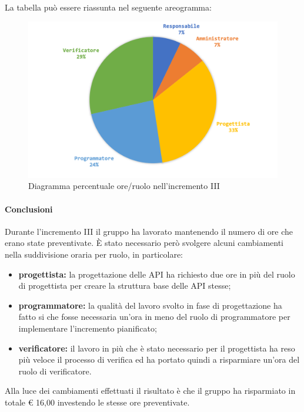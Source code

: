 			La tabella può essere riassunta nel seguente areogramma:
			\begin{figure}[H]
				\centering
				\includegraphics[width=0.8\linewidth]{images/consuntivo/ConsIncr3-2.png}
				\caption{Diagramma percentuale ore/ruolo nell'incremento III}
				\label{fig:consuntivo diagramma costi ruolo incremento III}
			\end{figure}

		\paragraph{Conclusioni}
			Durante l'incremento III il gruppo ha lavorato mantenendo il numero di ore che erano state preventivate. È stato necessario però svolgere alcuni cambiamenti nella suddivisione oraria per ruolo, in particolare:
			\begin{itemize}
				\item \textbf{progettista:} la progettazione delle API ha richiesto due ore in più del ruolo di progettista per creare la struttura base delle API stesse;
				\item \textbf{programmatore:} la qualità del lavoro svolto in fase di progettazione ha fatto si che fosse necessaria un'ora in meno del ruolo di programmatore per implementare l'incremento pianificato;
				\item \textbf{verificatore:} il lavoro in più che è stato necessario per il progettista ha reso più veloce il processo di verifica ed ha portato quindi a risparmiare un'ora del ruolo di verificatore.
			\end{itemize}
			Alla luce dei cambiamenti effettuati il risultato è che il gruppo ha risparmiato in totale € 16,00 investendo le stesse ore preventivate.
		
